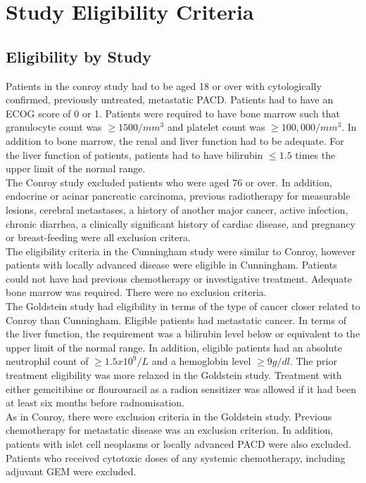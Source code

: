 \section{Study Eligibility Criteria}
\subsection{Eligibility by Study}
Patients in the conroy study had to be aged 18 or over with cytologically confirmed, previously untreated, metastatic PACD. Patients had to have an ECOG score of 0 or 1. Patients were required to have bone marrow such that granulocyte count was $\geq1500/mm^3$ and platelet count was $\geq100,000/mm^3$. In addition to bone marrow, the renal and liver function had to be adequate. For the liver function of patients, patients had to have bilirubin $\leq 1.5$ times the upper limit of the normal range. \\

The Conroy study excluded patients who were aged 76 or over. In addition, endocrine or acinar pancreatic carcinoma, previous radiotherapy for measurable lesions, cerebral metastases, a history of another major cancer, active infection, chronic diarrhea, a clinically significant history of cardiac disease, and pregnancy or breast-feeding were all exclusion critera. \\

The eligibility criteria in the Cunningham study were similar to Conroy, however patients with locally advanced disease were eligible in Cunningham. Patients could not have had previous chemotherapy or investigative treatment. Adequate bone marrow was required. There were no exclusion criteria. \\

The Goldstein study had eligibility in terms of the type of cancer closer related to Conroy than Cunningham. Eligible patients had metastatic cancer. In terms of the liver function, the requirement was a bilirubin level below or equivalent to the upper limit of the normal range. In addition, eligible patients had an absolute neutrophil count of $\geq 1.5x10^9/L$ and a hemoglobin level $\geq 9g/dl$. The prior treatment eligibility was more relaxed in the Goldstein study. Treatment with either gemcitibine or flourouracil as a radion sensitizer was allowed if it had been at least six months before radnomisation. \\

As in Conroy, there were exclusion criteria in the Goldstein study. Previous chemotherapy for metastatic disease was an exclusion criterion. In addition, patients with islet cell neoplasms or locally advanced PACD were also excluded. Patients who received cytotoxic doses of any systemic
chemotherapy, including adjuvant GEM were excluded. \\

